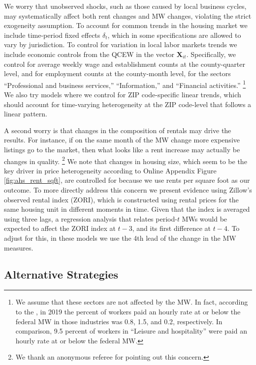 We worry that unobserved shocks, such as those caused by local business cycles, 
may systematically affect both rent changes and MW changes, violating the 
strict exogeneity assumption.
To account for common trends in the housing market we include time-period 
fixed effects $\delta_t$, which in some specifications are allowed to vary by 
jurisdiction.
To control for variation in local labor markets trends we include economic 
controls from the QCEW in the vector $\mathbf{X}_{it}$.
Specifically, we control for average weekly wage and establishment counts at the 
county-quarter level, and for employment counts at the county-month level, 
for the sectors ``Professional and business services,'' ``Information,'' and 
``Financial activities.''%
\footnote{We assume that these sectors are not affected by the MW.
    In fact, according to the \textcite[][Table 5]{MinWorkersReportBLS}, in 
    2019 the percent of workers paid an hourly rate at or below the federal MW 
    in those industries was 0.8, 1.5, and 0.2, respectively.
    In comparison, 9.5 percent of workers in ``Leisure and hospitality'' were 
    paid an hourly rate at or below the federal MW.}
We also try models where we control for ZIP code-specific linear
trends, which should account for time-varying heterogeneity at the ZIP 
code-level that follows a linear pattern.

A second worry is that changes in the composition of rentals may drive the 
results.
For instance, if on the same month of the MW change more expensive listings go
to the market, then what looks like a rent increase may actually be changes in 
quality.%
\footnote{We thank an anonymous referee for pointing out this concern.}
We note that changes in housing size, which seem to be the key driver 
in price heterogeneity according to Online Appendix Figure 
\ref{fig:ahs_rent_sqft}, are controlled for because we use rents per square foot
as our outcome.
To more directly address this concern we present evidence using Zillow's 
observed rental index (ZORI), which is constructed using rental prices for the 
same housing unit in different moments in time.
Given that the index is averaged using three lags, a regression analysis
that relates period-$t$ MWs would be expected to affect the ZORI index
at $t-3$, and its first difference at $t-4$.
To adjust for this, in these models we use the 4th lead of the change in 
the MW measures.

\subsection{Alternative Strategies}\label{sec:alt_emp_strategies}

